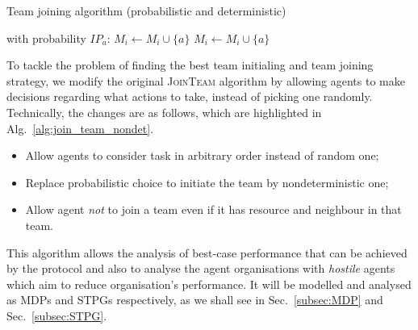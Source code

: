 \documentclass{llncs}
\newcommand{\comment}[1]{\marginpar{\footnotesize \color{red} \textsf{#1}}}
\begin{document}
\begin{algorithm}[H]
\caption{Team joining algorithm \cite{gaston2005agent} (probabilistic and deterministic)}
\label{alg:join_team_org}
\begin{scriptsize}
\begin{algorithmic}
     
       
	 
	  \State with probability $IP_a$: $M_i \leftarrow M_i \cup \{a\}$ 
	\EndIf
       
	 
	  \State $M_i \leftarrow M_i \cup \{a\}$ 
	\EndIf
      \EndIf
    \EndIf
  \EndFor
\EndProcedure
\end{algorithmic}
\end{scriptsize}
\end{algorithm}
%

To tackle the problem of finding the best team initialing and team joining strategy, we modify the original \textsc{JoinTeam} algorithm by
allowing agents to make decisions regarding what actions to take, instead of picking one randomly. Technically, the changes are as follows, which
are highlighted in Alg.~\ref{alg:join_team_nondet}.
\begin{itemize}
 \item Allow agents to consider task in arbitrary order instead of random one;
 \item Replace probabilistic choice to initiate the team by nondeterministic one;
 \item Allow agent \emph{not} to join a team even if it has resource and neighbour in that team.
\end{itemize}
%
This algorithm allows the analysis of best-case performance that can be achieved by the protocol and also to analyse the agent organisations with \emph{hostile} agents which aim to reduce organisation's performance. It will be modelled and analysed as MDPs and STPGs respectively, as we shall see in Sec.~\ref{subsec:MDP} and Sec.~\ref{subsec:STPG}.
\end{document}
